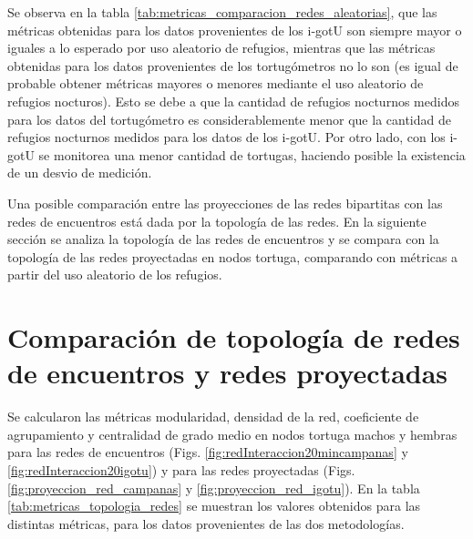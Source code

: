 Se observa en la tabla \ref{tab:metricas_comparacion_redes_aleatorias}, que las métricas obtenidas para los datos provenientes de los i-gotU son siempre mayor o iguales a lo esperado por uso aleatorio de refugios, mientras que las métricas obtenidas para los datos provenientes de los tortugómetros no lo son (es igual de probable obtener métricas mayores o menores mediante el uso aleatorio de refugios nocturos). Esto se debe a que la cantidad de refugios nocturnos medidos para los datos del tortugómetro es considerablemente menor que la cantidad de refugios nocturnos medidos para los datos de los i-gotU. Por otro lado, con los i-gotU se monitorea una menor cantidad de tortugas, haciendo posible la existencia de un desvio de medición.
 
Una posible comparación entre las proyecciones de las redes bipartitas con las redes de encuentros está dada por la topología de las redes.  En la siguiente sección se analiza la topología de las redes de encuentros y se compara con la topología de las redes proyectadas en nodos tortuga, comparando con métricas a partir del uso aleatorio de los refugios.
\section{Comparación de topología de redes de encuentros y redes proyectadas}
Se calcularon las métricas modularidad, densidad de la red, coeficiente de agrupamiento y centralidad de grado medio en nodos tortuga machos y hembras para las redes de encuentros (Figs. \ref{fig:redInteraccion20mincampanas} y \ref{fig:redInteraccion20igotu}) y para las redes proyectadas (Figs. \ref{fig:proyeccion_red_campanas} y \ref{fig:proyeccion_red_igotu}). En la tabla \ref{tab:metricas_topologia_redes}   se muestran los valores obtenidos para las distintas métricas, para los datos provenientes de las dos metodologías.
 
 
 
